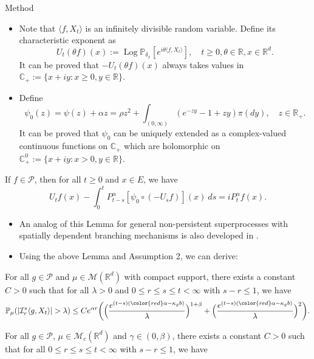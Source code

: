 \documentclass[9pt]{beamer}
\begin{document}
\begin{frame}[allowframebreaks]{Method}
\begin{itemize}
\item
	Note that $\langle f,X_t\rangle$ is an infinitely divisible random variable. Define its characteristic exponent as
	\[U_t(\theta f)(x) := \operatorname{Log} \mathbb P_{\delta_x}[e^{i\theta \langle f, X_t\rangle}],
	\quad t\geq 0, \theta \in \mathbb R, x\in \mathbb R^d.\]
	It can be proved that $-U_t(\theta f)(x)$ always takes values in $\mathbb C_+:= \{x+iy:x\geq 0, y\in \mathbb R\}$.
\item
	Define
\[
	\psi_0(z) = \psi(z)+\alpha z = \rho z^2 + \int_{(0,\infty)} (e^{-zy} - 1 + zy) \pi(dy),
    \quad  z \in \mathbb R_+.
\]
	It can be proved that $\psi_0$ can be uniquely extended as a complex-valued continuous functions on $\mathbb C_+$ which are holomorphic on $\mathbb C_+^0:= \{x+iy: x>0, y\in \mathbb R\}$.
\end{itemize}
\begin{lemma}
    If $f\in \mathcal P$, then for all $t\geq 0$ and $x\in E$, we have
\begin{equation}
    U_tf(x) -  \int_0^t P_{t-s}^\alpha [\psi_0 \circ (- U_{s}f)](x)~ds
    = iP_t^{\alpha} f(x).
\end{equation}
\end{lemma}
\begin{itemize}
\item
	An analog of this Lemma for general non-persistent superprocesses with spatially dependent branching mechanisms is also developed in \cite{RenSongSunZhao2019Stable}.
\item
	Using the above Lemma and Assumption 2, we can derive:
\end{itemize}
\begin{lemma}
    For all $g \in \mathcal P$ and $\mu \in \mathcal M(\mathbb R^d)$ with compact support, there exists a constant $C > 0$ such that for all $\lambda > 0$ and $0\leq r\leq s\leq t<\infty$ with $s-r \leq 1$, we have
\[
    \mathbb P_{\mu}(|\mathcal I_r^s\langle g, X_t\rangle|>\lambda)
    \leq C e^{\alpha r} \bigg(\Big( \frac{e^{(t-s)({\color{red}\alpha - \kappa_g b})}}{\lambda}\Big)^{1+\beta} + \Big( \frac{e^{(t-s)({\color{red}\alpha - \kappa_g b})}}{\lambda}\Big)^{2} \bigg).
\]
\end{lemma}
\begin{lemma}
    For all $g \in \mathcal P$, $\mu \in \mathcal M_c(\mathbb R^d)$ and $\gamma\in (0, \beta)$, there exists a constant $C > 0$ such that for all $0\leq r\leq s\leq t<\infty$ with $s-r \leq 1$, we have

\end{lemma}
\end{frame}
\end{document}
